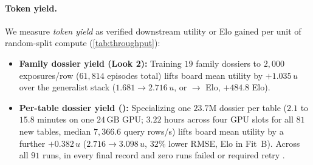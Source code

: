 \paragraph{Token yield.}
We measure \emph{token yield} as verified downstream utility or Elo gained per unit of random-split compute (\cref{tab:throughput}):
\begin{itemize}
  \item \textbf{Family dossier yield (Look 2):} Training $19$ family dossiers to $2{,}000$ exposures/row ($61{,}814$ episodes total) lifts  board mean utility by $+1.035\,u$ over the \regincorpus{} generalist stack ($1.681 \to 2.716\,u$, or \BHEloInCorpus{} $\to$ \BHEloRecall{} Elo, $+484.8$ Elo).
  \item \textbf{Per-table dossier yield ():} Specializing one $23.7\mathrm{M}$ dossier per table ($2.1$ to $15.8$ minutes on one $24\,\mathrm{GB}$ GPU; $3.22$ hours across four GPU slots for all $81$ new tables, median $7{,}366.6$ query rows/s) lifts board mean utility by a further $+0.382\,u$ ($2.716 \to 3.098\,u$, $32\%$ lower RMSE, \BHEloGenTwoA{} Elo in Fit~B). Across all $91$ runs,  in every final record and zero runs failed or required retry \est{}.
\end{itemize}
